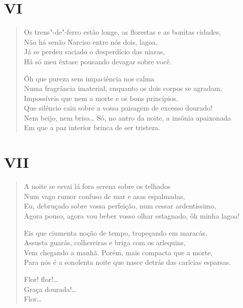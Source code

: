 \medskip
\section*{VI}

\begin{verse}
Os trens"-de"-ferro estão longe, as florestas e as bonitas cidades,\\
Não há senão Narciso entre nós dois, lagoa,\\
Já se perdeu saciado o desperdício das uiaras,\\
Há só meu êxtase pousando devagar sobre você.

Ôh que pureza sem impaciência nos calma\\
Numa fragrância imaterial, enquanto os dois corpos se agradam,\\
Impossíveis que nem a morte e os bons princípios.\\
Que silêncio caiu sobre a vossa paisagem de excesso dourado!\\
Nem beijo, nem brisa\ldots{} Só, no antro da noite, a insônia apaixonada\\
Em que a paz interior brinca de ser tristeza.
\end{verse}

\medskip
\section*{VII}

\begin{verse}
A noite se esvai lá fora serena sobre os telhados\\
Num vago rumor confuso de mar e asas espalmadas,\\
Eu, debruçado sobre vossa perfeição, num cessar ardentíssimo,\\
Agora pouso, agora vou beber vosso olhar estagnado, ôh minha lagoa!

Eis que ciumenta noção de tempo, tropeçando em maracás,\\
Assusta guarás, colhereiras e briga com os arlequins,\\
Vem chegando a manhã. Porém, mais compacta que a morte,\\
Para nós é a sonolenta noite que nasce detrás das carícias esparsas.

Flor! flor!\ldots{}\\
\quad\quad\quad\quad{}Graça dourada!\ldots{}\\
\quad\quad\quad\quad\quad\quad\quad\quad\quad\quad{}Flor\ldots{}
\end{verse}

